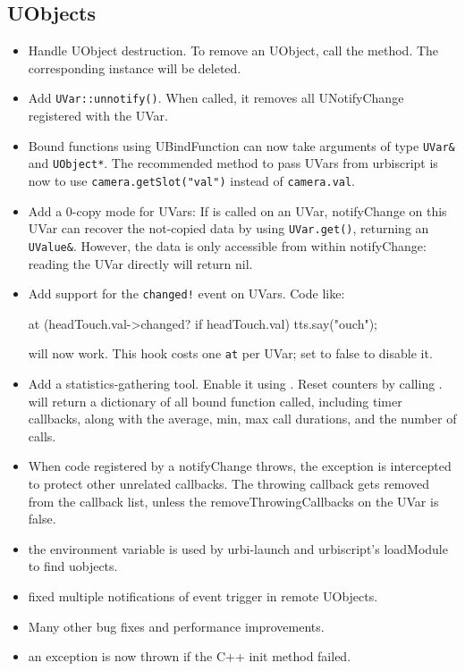\subsection{UObjects}
\begin{itemize}
\item Handle UObject destruction. To remove an UObject, call the \us
   method. The corresponding \Cxx instance will be deleted.

\item Add \lstinline|UVar::unnotify()|. When called, it removes all
  UNotifyChange registered with the UVar.

\item Bound functions using UBindFunction can now take arguments of type
  \lstinline|UVar&| and \lstinline|UObject*|. The recommended method to pass
  UVars from urbiscript is now to use \lstinline{camera.getSlot("val")}
  instead of \lstinline{camera.val}.

\item Add a 0-copy mode for UVars: If  is
  called on an UVar, notifyChange on this UVar can recover the not-copied
  data by using \lstinline|UVar.get()|, returning an
  \lstinline|UValue&|. However, the data is only accessible from within
  notifyChange: reading the UVar directly will return nil.

\item Add support for the \lstinline|changed!| event on UVars. Code like:

\begin{urbiunchecked}
at (headTouch.val->changed? if headTouch.val)
  tts.say("ouch");
\end{urbiunchecked}
  \noindent
  will now work. This hook costs one \lstinline|at| per UVar; set
   to false to disable it.

\item Add a statistics-gathering tool. Enable it using
  . Reset counters by calling
  .  will return a
  dictionary of all bound \Cxx function called, including timer callbacks,
  along with the average, min, max call durations, and the number of calls.

\item When code registered by a notifyChange throws, the exception is
  intercepted to protect other unrelated callbacks. The throwing
  callback gets removed from the callback list, unless the
  removeThrowingCallbacks on the UVar is false.

\item the environment variable  is used by
  urbi-launch and urbiscript's loadModule to find uobjects.

\item fixed multiple notifications of event trigger in remote UObjects.

\item Many other bug fixes and performance improvements.

\item an exception is now thrown if the C++ init method failed.
\end{itemize}


